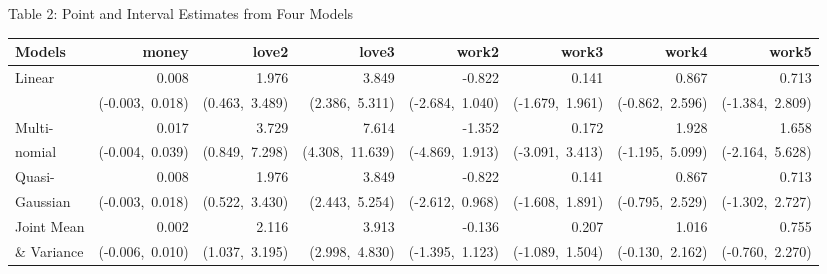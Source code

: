 \documentclass[11pt,letterpaper]{article}
\begin{document}
\begin{center}
Table 2: Point and Interval Estimates from Four Models \\
\vspace{0.5em}
{\footnotesize
\begin{tabular}{lrrrrrrr}
\toprule[1pt]
Models      & money & love2 & love3 & work2 & work3 & work4 & work5 \\
\midrule
Linear      & 0.008 & 1.976 & 3.849 & -0.822 & 0.141 & 0.867 & 0.713 \\
            & {\scriptsize(-0.003,\ 0.018)} & {\scriptsize(0.463,\ 3.489)} & {\scriptsize(2.386,\ 5.311)} & {\scriptsize(-2.684,\ 1.040)} & {\scriptsize(-1.679,\ 1.961)} & {\scriptsize(-0.862,\ 2.596)} & {\scriptsize(-1.384,\ 2.809)} \\
Multi-      & 0.017 & 3.729 & 7.614 & -1.352 & 0.172 & 1.928 & 1.658 \\
nomial      & {\scriptsize(-0.004,\ 0.039)} & {\scriptsize(0.849,\ 7.298)} & {\scriptsize(4.308,\ 11.639)} & {\scriptsize(-4.869,\ 1.913)} & {\scriptsize(-3.091,\ 3.413)} & {\scriptsize(-1.195,\ 5.099)} & {\scriptsize(-2.164,\ 5.628)} \\
Quasi-      & 0.008 & 1.976 & 3.849 & -0.822 & 0.141 & 0.867 & 0.713 \\
Gaussian    & {\scriptsize(-0.003,\ 0.018)} & {\scriptsize(0.522,\ 3.430)} & {\scriptsize(2.443,\ 5.254)} & {\scriptsize(-2.612,\ 0.968)} & {\scriptsize(-1.608,\ 1.891)} & {\scriptsize(-0.795,\ 2.529)} & {\scriptsize(-1.302,\ 2.727)} \\
Joint Mean  & 0.002 & 2.116 & 3.913 & -0.136 & 0.207 & 1.016 & 0.755 \\
\& Variance & {\scriptsize(-0.006,\ 0.010)} & {\scriptsize(1.037,\ 3.195)} & {\scriptsize(2.998,\ 4.830)} & {\scriptsize(-1.395,\ 1.123)} & {\scriptsize(-1.089,\ 1.504)} & {\scriptsize(-0.130,\ 2.162)} & {\scriptsize(-0.760,\ 2.270)} \\
\bottomrule[1pt]
\end{tabular}}
\end{center}
\end{document}
